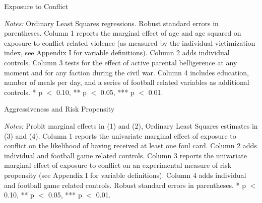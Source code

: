 \documentclass[10pt,a4paper]{scrartcl} %
\begin{document}
\begin{table}
  \centering
  \begin{threeparttable}[p!]
    \caption{Exposure to Conflict}
    \singlespacing
    \small
    \label{tab:slf:conflictexposure}
    
    \begin{tablenotes}
      \footnotesize
      \item \textit{Notes:} Ordinary Least Squares regressions. Robust standard errors in parentheses. Column 1 reports the marginal effect of age and age squared on exposure to conflict related violence (as measured by the individual victimization index, see Appendix I for variable definitions). Column 2 adds individual controls. Column 3 tests for the effect of active parental belligerence at any moment and for any faction during the civil war. Column 4 includes education, number of meals per day, and a series of football related variables as additional controls.  * p $<$ 0.10, ** p $<$ 0.05, *** p $<$ 0.01.
      \item
    \end{tablenotes}
\end{threeparttable}
\end{table}

\begin{table}
\centering
\begin{threeparttable}
  \caption{Aggressiveness and Risk Propensity}
  \label{tab:slf:aggrisk}
  \singlespacing
  
  \begin{tablenotes}
    \footnotesize
    \item \textit{Notes:} Probit marginal effects in (1) and (2), Ordinary Least Squares estimates in (3) and (4). Column 1 reports the univariate marginal effect of exposure to conflict on the likelihood of having received at least one foul card. Column 2 adds individual and football game related controls. Column 3 reports the univariate marginal effect of exposure to conflict on an experimental measure of risk propensity (see Appendix I for variable definitions). Column 4 adds individual and football game related controls. Robust standard errors in parentheses. * p $<$ 0.10, ** p $<$ 0.05, *** p $<$ 0.01.
    \item
  \end{tablenotes}
\end{threeparttable}
\end{table}
\end{document}
